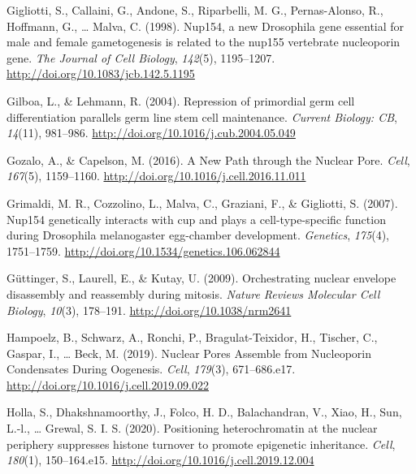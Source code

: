 \documentclass[12pt,oneside]{reedthesis}
\begin{document}
\leavevmode\hypertarget{ref-gigliottiNup154NewDrosophila1998}{}%
Gigliotti, S., Callaini, G., Andone, S., Riparbelli, M. G., Pernas-Alonso, R., Hoffmann, G., \ldots{} Malva, C. (1998). Nup154, a new Drosophila gene essential for male and female gametogenesis is related to the nup155 vertebrate nucleoporin gene. \emph{The Journal of Cell Biology}, \emph{142}(5), 1195--1207. \url{http://doi.org/10.1083/jcb.142.5.1195}

\leavevmode\hypertarget{ref-gilboaRepressionPrimordialGerm2004}{}%
Gilboa, L., \& Lehmann, R. (2004). Repression of primordial germ cell differentiation parallels germ line stem cell maintenance. \emph{Current Biology: CB}, \emph{14}(11), 981--986. \url{http://doi.org/10.1016/j.cub.2004.05.049}

\leavevmode\hypertarget{ref-gozaloNewPathNuclear2016}{}%
Gozalo, A., \& Capelson, M. (2016). A New Path through the Nuclear Pore. \emph{Cell}, \emph{167}(5), 1159--1160. \url{http://doi.org/10.1016/j.cell.2016.11.011}

\leavevmode\hypertarget{ref-grimaldiNup154GeneticallyInteracts2007}{}%
Grimaldi, M. R., Cozzolino, L., Malva, C., Graziani, F., \& Gigliotti, S. (2007). Nup154 genetically interacts with cup and plays a cell-type-specific function during Drosophila melanogaster egg-chamber development. \emph{Genetics}, \emph{175}(4), 1751--1759. \url{http://doi.org/10.1534/genetics.106.062844}

\leavevmode\hypertarget{ref-guttingerOrchestratingNuclearEnvelope2009b}{}%
Güttinger, S., Laurell, E., \& Kutay, U. (2009). Orchestrating nuclear envelope disassembly and reassembly during mitosis. \emph{Nature Reviews Molecular Cell Biology}, \emph{10}(3), 178--191. \url{http://doi.org/10.1038/nrm2641}

\leavevmode\hypertarget{ref-hampoelzNuclearPoresAssemble2019}{}%
Hampoelz, B., Schwarz, A., Ronchi, P., Bragulat-Teixidor, H., Tischer, C., Gaspar, I., \ldots{} Beck, M. (2019). Nuclear Pores Assemble from Nucleoporin Condensates During Oogenesis. \emph{Cell}, \emph{179}(3), 671--686.e17. \url{http://doi.org/10.1016/j.cell.2019.09.022}

\leavevmode\hypertarget{ref-hollaPositioningHeterochromatinNuclear2020}{}%
Holla, S., Dhakshnamoorthy, J., Folco, H. D., Balachandran, V., Xiao, H., Sun, L.-l., \ldots{} Grewal, S. I. S. (2020). Positioning heterochromatin at the nuclear periphery suppresses histone turnover to promote epigenetic inheritance. \emph{Cell}, \emph{180}(1), 150--164.e15. \url{http://doi.org/10.1016/j.cell.2019.12.004}
\end{document}
